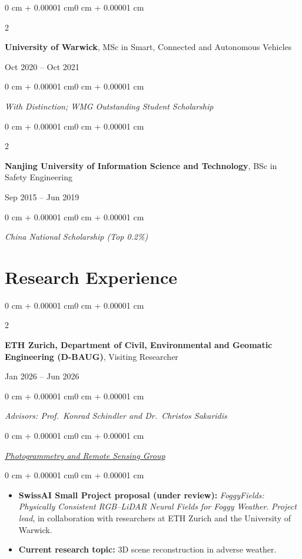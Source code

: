 \documentclass[10pt, letterpaper]{article}
\newenvironment{highlights}{
    \begin{itemize}[
        topsep=0.10 cm,
        parsep=0.10 cm,
        partopsep=0pt,
        itemsep=0pt,
        leftmargin=0 cm + 10pt
    ]
}{
    \end{itemize}
}
\newenvironment{onecolentry}{
    \begin{adjustwidth}{0 cm + 0.00001 cm}{0 cm + 0.00001 cm}
}{
    \end{adjustwidth}
}
\newenvironment{twocolentry}[2][]{
    \onecolentry
    \def\secondColumn{#2}
    \setcolumnwidth{\fill, 6.5 cm}
    \begin{paracol}{2}
}{
    \switchcolumn \raggedleft \secondColumn
    \end{paracol}
    \endonecolentry
}
\begin{document}
\vspace{0.12cm}

\begin{twocolentry}{Oct 2020 -- Oct 2021}
    \textbf{University of Warwick}, MSc in Smart, Connected and Autonomous Vehicles
\end{twocolentry}
\begin{onecolentry}
    \textit{With Distinction; WMG Outstanding Student Scholarship}
\end{onecolentry}

\vspace{0.12cm}

\begin{twocolentry}{Sep 2015 -- Jun 2019}
    \textbf{Nanjing University of Information Science and Technology}, BSc in Safety Engineering
\end{twocolentry}
\begin{onecolentry}
    \textit{China National Scholarship (Top 0.2\%)}
\end{onecolentry}

\section{Research Experience}

\begin{twocolentry}{Jan 2026 -- Jun 2026}
    \textbf{ETH Zurich, Department of Civil, Environmental and Geomatic Engineering (D-BAUG)}, Visiting Researcher
\end{twocolentry}
\begin{onecolentry}
    \textit{Advisors: Prof.\ Konrad Schindler and Dr.\ Christos Sakaridis}
\end{onecolentry}
\begin{onecolentry}
    \href{https://prs.igp.ethz.ch/}{\textit{Photogrammetry and Remote Sensing Group}}
\end{onecolentry}
\begin{onecolentry}
    \begin{highlights}
        \item \textbf{SwissAI Small Project proposal (under review):} \textit{FoggyFields: Physically Consistent RGB--LiDAR Neural Fields for Foggy Weather}. \textit{Project lead}, in collaboration with researchers at ETH Zurich and the University of Warwick.
        \item \textbf{Current research topic:} 3D scene reconstruction in adverse weather.
    \end{highlights}
\end{onecolentry}
\end{document}
